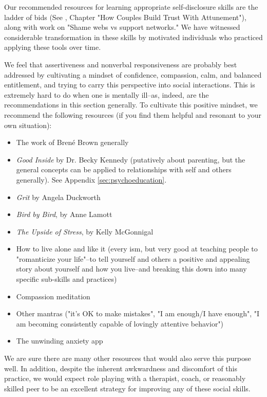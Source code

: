 \documentclass[12pt,letterpaper]{book}
\begin{document}
Our recommended resources for learning appropriate self-disclosure skills are the ladder of bids (See \textcite{gottmanTrust}, Chapter "How Couples Build Trust With Attunement"), along with \textcite{brownDaring} work on "Shame webs vs support networks." We have witnessed considerable transformation in these skills by motivated individuals who practiced applying these tools over time.

We feel that assertiveness and nonverbal responsiveness are probably best addressed by cultivating a mindset of confidence, compassion, calm, and balanced entitlement, and trying to carry this perspective into social interactions. This is extremely hard to do when one is mentally ill–as, indeed, are the recommendations in this section generally. To cultivate this positive mindset, we recommend the following resources (if you find them helpful and resonant to your own situation):
\begin{itemize}
	\item The work of Bren{\'e} Brown generally
	\item \textit{Good Inside} by Dr. Becky Kennedy (putatively about parenting, but the general concepts can be applied to relationships with self and others generally). See Appendix \ref{sec:psychoeducation}.
	\item \textit{Grit} by Angela Duckworth
	\item \textit{Bird by Bird}, by Anne Lamott
	\item \textit{The Upside of Stress}, by Kelly McGonnigal
	\item How to live alone and like it (every ism, but very good at teaching people to "romanticize your life"–to tell yourself and others a positive and appealing story about yourself and how you live–and breaking this down into many specific sub-skills and practices)
	\item Compassion meditation
	\item Other mantras ("it's OK to make mistakes", "I am enough/I have enough", "I am becoming consistently capable of lovingly attentive behavior")
	\item The unwinding anxiety app
\end{itemize}

We are sure there are many other resources that would also serve this purpose well. In addition, despite the inherent awkwardness and discomfort of this practice, we would expect role playing with a therapist, coach, or reasonably skilled peer to be an excellent strategy for improving any of these social skills.
\end{document}
